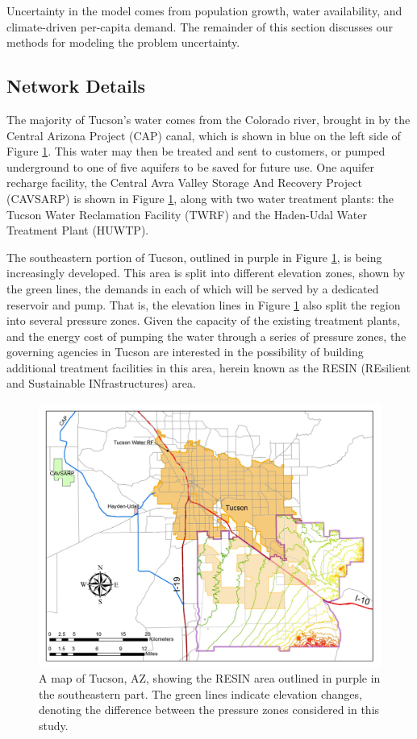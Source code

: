\documentclass[opre,nonblindrev]{informs3} %
\begin{document}
Uncertainty in the model comes from population growth, water availability, and climate-driven per-capita demand.
The remainder of this section discusses our methods for modeling the problem uncertainty.


\subsection{Network Details}

The majority of Tucson's water comes from the Colorado river, brought in by the Central Arizona Project (CAP) canal, which is shown in blue on the left side of Figure \ref{fig:tucson_elevation}.
This water may then be treated and sent to customers, or pumped underground to one of five aquifers to be saved for future use.
One aquifer recharge facility, the Central Avra Valley Storage And Recovery Project (CAVSARP) is shown in Figure \ref{fig:tucson_elevation}, along with two water treatment plants: the Tucson Water Reclamation Facility (TWRF) and the Haden-Udal Water Treatment Plant (HUWTP).

The southeastern portion of Tucson, outlined in purple in Figure \ref{fig:tucson_elevation}, is being increasingly developed.
This area is split into different elevation zones, shown by the green lines, the demands in each of which will be served by a dedicated reservoir and pump.
That is, the elevation lines in Figure \ref{fig:tucson_elevation} also split the region into several pressure zones.
Given the capacity of the existing treatment plants, and the energy cost of pumping the water through a series of pressure zones, the governing agencies in Tucson are interested in the possibility of building additional treatment facilities  in this area, herein known as the RESIN (REsilient and Sustainable INfrastructures) area.

\begin{figure}
	\FIGURE
	{%
		\includegraphics*[width=.6\textwidth]{tucson_water_images/tucson_elevation.png}%
	}
	{
		A map of Tucson, AZ, showing the RESIN area outlined in purple in the southeastern part.
		The green lines indicate elevation changes, denoting the difference between the pressure zones considered in this study.
		\label{fig:tucson_elevation}
	}
	{}
\end{figure}
\end{document}
